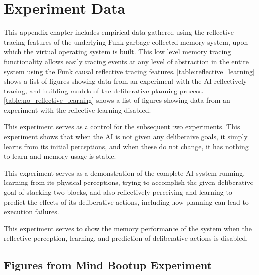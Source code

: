 \chapter{Experiment Data}
\label{chapter:experiment_data}

This appendix chapter includes empirical data gathered using the
reflective tracing features of the underlying Funk garbage collected
memory system, upon which the virtual operating system is built.  This
low level memory tracing functionality allows easily tracing events at
any level of abstraction in the entire system using the Funk causal
reflective tracing features.  \autoref{table:reflective_learning}
shows a list of figures showing data from an experiment with the AI
reflectively tracing, and building models of the deliberative planning
process.  \autoref{table:no_reflective_learning} shows a list of
figures showing data from an experiment with the reflective learning
disabled.

 {This experiment serves as a
  control for the subsequent two experiments.  This experiment shows
  that when the AI is not given any deliberaive goals, it simply
  learns from its initial perceptions, and when these do not change,
  it has nothing to learn and memory usage is stable.}

 {This experiment serves as a demonstration of the
  complete AI system running, learning from its physical perceptions,
  trying to accomplish the given deliberative goal of stacking two
  blocks, and also reflectively perceiving and learning to predict the
  effects of its deliberative actions, including how planning can lead
  to execution failures.}

 {This experiment serves to show the memory
  performance of the system when the reflective perception, learning,
  and prediction of deliberative actions is disabled.}


\clearpage
\section{Figures from Mind Bootup Experiment}

